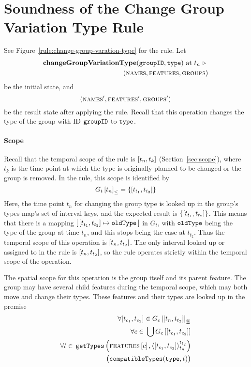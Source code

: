 \section{Soundness of the Change Group Variation Type Rule} 
\label{sec:soundness-of-the-change-group-variation-type-rule}

See Figure~\vref{rule:change-group-varation-type} for the  rule. Let 
\begin{equation*}
   \begin{split}
      \textbf{changeGroupVariationType}(\texttt{groupID}, \texttt{type}) \text{ at } t_n \ \triangleright \  \\
      (\textsc{names}, \textsc{features}, \textsc{groups}{})
   \end{split}
\end{equation*}
be the initial state, and
\[
   (\textsc{names}', \textsc{features}', \textsc{groups}{}')
\]
be the result state after applying the  rule. Recall that this operation changes the type of the group with ID $\texttt{groupID}$ to $\texttt{type}$.

\paragraph{Scope}
Recall that the temporal scope of the  rule is $\interval{t_n}{t_k}$ (Section~\vref{sec:scope}), where $t_k$ is the time point at which the type is originally planned to be changed or the group is removed. In the rule, this scope is identified by 
   \[
      \containing{G_t}{t_n} = \set{\interval{t_{t_1}}{t_{t_2}}}
   \]
   Here, the time point $t_n$ for changing the group type is looked up in the group's types map's set of interval keys, and the expected result is $\set{\interval{t_{t_1}}{t_{t_2}}}$. This means that there is a mapping $\intervalmapping{t_{t_1}}{t_{t_2}}{\var{oldType}}$ in $G_t$, with $\texttt{oldType}$ being the type of the group at time $t_n$, and this stops being the case at $t_{t_2}$. Thus the temporal scope of this operation is $\interval{t_n}{t_{t_2}}$. The only interval looked up or assigned to in the rule is $\interval{t_n}{t_{t_2}}$, so the rule operates strictly within the temporal scope of the operation.

   The spatial scope for this operation is the group itself and its parent feature. The group may have several child features during the temporal scope, which may both move and change their types. These features and their types are looked up in the premise
\[
   \begin{split}
        \forall \interval{t_{c_1}}{t_{c_2}} \in \overlapping{G_c}{t_n}{t_{t_2}}\\ %
        \forall c \in \, \bigcup \lookup{G_c}{\interval{t_{c_1}}{t_{c_2}}}\\ %
        \forall t \in \, \var{getTypes}\left(\lookup{\features}{c}, \clamp{\interval{t_{c_1}}{t_{c_2}}}{t_n}{t_{t_2}}\right) \\ %
        \big(\var{compatibleTypes}(\var{type}, t)\big)
   \end{split}
\]

